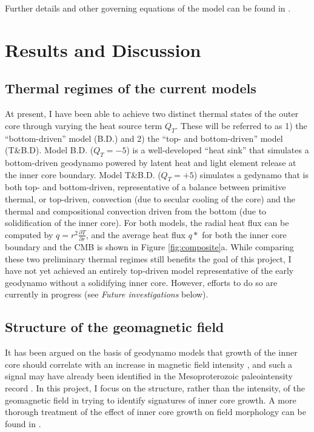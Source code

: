 \documentclass[12pt,letterpaper]{article}
\begin{document}
Further details and other governing equations of the model can be found in \cite{Matsui2014a}.


\section*{Results and Discussion}
\subsection*{Thermal regimes of the current models}
At present, I have been able to achieve two distinct thermal states of the outer core through varying the heat source term $Q_T$. These will be referred to as 1) the ``bottom-driven'' model (B.D.) and 2) the ``top- and bottom-driven'' model (T\&B.D). Model B.D. ($Q_T = -5$) is a well-developed ``heat sink'' that simulates a bottom-driven geodynamo powered by latent heat and light element release at the inner core boundary. Model T\&B.D. ($Q_T = +5$) simulates a gedynamo that is both top- and bottom-driven, representative of a balance between primitive thermal, or top-driven, convection (due to secular cooling of the core) and the thermal and compositional convection driven from the bottom (due to solidification of the inner core). For both models, the radial heat flux can be computed by $q=r^2\frac{\partial T}{\partial r}$, and the average heat flux $q*$ for both the inner core boundary and the CMB is shown in Figure \ref{fig:composite}a. While comparing these two preliminary thermal regimes still benefits the goal of this project, I have not yet achieved an entirely top-driven model representative of the early geodynamo without a solidifying inner core. However, efforts to do so are currently in progress (see \textit{Future investigations} below).

\subsection*{Structure of the geomagnetic field}
It has been argued on the basis of geodynamo models that growth of the inner core should correlate with an increase in magnetic field intensity \citep{Aubert2009a}, and such a signal may have already been identified in the Mesoproterozoic paleointensity record \citep{Biggin2015a}. In this project, I focus on the structure, rather than the intensity, of the geomagnetic field in trying to identify signatures of inner core growth. A more thorough treatment of the effect of inner core growth on field morphology can be found in \cite{Driscoll2016b}.
\end{document}
